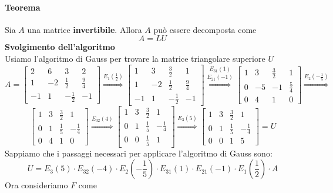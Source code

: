 \documentclass[a4paper, 10pt]{article}
\begin{document}
	\paragraph*{Teorema} Sia $A$ una matrice \textbf{invertibile}. Allora $A$ può essere decomposta come 
	\[ A = LU \]
	\textbf{Svolgimento dell'algoritmo} \\
	Usiamo l'algoritmo di Gauss per trovare la matrice triangolare superiore $U$
	\[
		A=
		\begin{bmatrix}
		2 & 6 & 3 & 2 \\
		1 & -2 & \frac{1}{2} & \frac{9}{4} \\
		-1 & 1 & -\frac{1}{2} & -1
		\end{bmatrix}
		\stackrel{E_{1}(\frac{1}{2})}\Longrightarrow	
		\begin{bmatrix}
		1 & 3 & \frac{3}{2} & 1 \\
		1 & -2 & \frac{1}{2} & \frac{9}{4} \\
		-1 & 1 & -\frac{1}{2} & -1
		\end{bmatrix}
		\stackrel{E_{31}(1)}{\stackrel{E_{21}(-1)}\Longrightarrow}
		\begin{bmatrix}
		1 & 3 & \frac{3}{2} & 1 \\
		0 & -5 & -1 & \frac{5}{4} \\
		0 & 4 & 1 & 0
		\end{bmatrix}
		\stackrel{E_{2}(-\frac{1}{5})}\Longrightarrow	
	\]
	\[
		\begin{bmatrix}
		1 & 3 & \frac{3}{2} & 1 \\
		0 & 1 & \frac{1}{5} & -\frac{1}{4} \\
		0 & 4 & 1 & 0
		\end{bmatrix}
		\stackrel{E_{32}(4)}\Longrightarrow	
		\begin{bmatrix}
		1 & 3 & \frac{3}{2} & 1 \\
		0 & 1 & \frac{1}{5} & -\frac{1}{4} \\
		0 & 0 & \frac{1}{5} & 1
		\end{bmatrix}
		\stackrel{E_{3}(5)}\Longrightarrow
		\begin{bmatrix}
		1 & 3 & \frac{3}{2} & 1 \\
		0 & 1 & \frac{1}{5} & -\frac{1}{4} \\
		0 & 0 & 1 & 5
		\end{bmatrix}
		= U
	\]
	Sappiamo che i passaggi necessari per applicare l'algoritmo di Gauss sono:
	\[ U = E_{3}(5) \cdot E_{32}(-4) \cdot E_{2}(-\frac{1}{5}) \cdot E_{31}(1) \cdot 
	E_{21}(-1) \cdot E_{1}(\frac{1}{2}) \cdot A \]
	Ora consideriamo $F$ come
\end{document}
